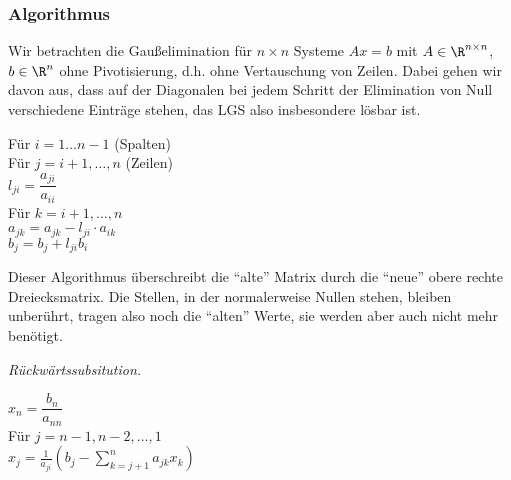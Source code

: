 \subsubsection{Algorithmus}
Wir betrachten die Gaußelimination für $n\times n$ Systeme $Ax = b$ mit
$A\in\R^{n\times n}$, $b\in\R^n$ ohne Pivotisierung, d.h. ohne Vertauschung von
Zeilen. Dabei gehen wir davon aus, dass auf der Diagonalen bei jedem Schritt der Elimination von Null verschiedene
Einträge stehen, das LGS also insbesondere lösbar ist.

\begin{tabbing}
\hspace{20pt}	Für $i=1\ldots n-1$ (Spalten)\\
\hspace{40pt}		Für $j=i+1,\ldots,n$ (Zeilen)\\
\hspace{60pt}			$l_{ji} = \dfrac{a_{ji}}{a_{ii}}$\\
\hspace{60pt}			Für $k=i+1,\ldots,n$\\
\hspace{80pt}				$a_{jk} = a_{jk}-l_{ji}\cdot a_{ik}$\\
\hspace{60pt}			$b_j = b_j + l_{ji}b_i$
\end{tabbing}
		
Dieser Algorithmus überschreibt die ``alte'' Matrix durch die ``neue'' obere
rechte Dreiecksmatrix. Die Stellen, in der normalerweise Nullen stehen, bleiben
unberührt, tragen also noch die ``alten'' Werte, sie werden aber auch nicht
mehr benötigt.

\noindent\textit{Rückwärtssubsitution.}
\begin{tabbing}
\hspace{20pt}	$x_n = \dfrac{b_n}{a_{nn}}$\\
\hspace{20pt}	Für $j=n-1,n-2,\ldots,1$\\
\hspace{40pt}			$x_j = \frac{1}{a_{ji}}\left(b_j - \sum\limits_{k=j+1}^n a_{jk}
x_k \right)$
\end{tabbing}

